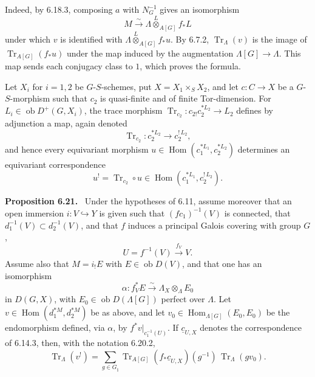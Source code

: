 \documentclass[12pt]{article}
\newcommand{\Hom}{\operatorname{Hom}}
\newcommand{\Tr}{\operatorname{Tr}}
\newcommand{\ob}{\operatorname{ob}}
\newenvironment{statement}[1]{\par\medskip\noindent\textbf{#1.}\ }{\par\medskip}
\begin{document}
Indeed, by 6.18.3, composing $a$ with $N_G^{-1}$ gives an isomorphism
\[
       M\xrightarrow{\sim}\Lambda\overset{L}{\otimes}_{A[G]}f_*L
\]
under which $v$ is identified with $\Lambda\overset{L}{\otimes}_{A[G]}f_*u$. By
6.7.2, $\Tr_\Lambda(v)$ is the image of $\Tr_{A[G]}(f_*u)$ under the map induced
by the augmentation $\Lambda[G]\to\Lambda$. This map sends each conjugacy class
to $1$, which proves the formula.

Let $X_i$ for $i=1,2$ be $G$-$S$-schemes, put $X=X_1\times_S X_2$, and let
$c:C\to X$ be a $G$-$S$-morphism such that $c_2$ is quasi-finite and of finite
Tor-dimension. For $L_i\in\ob D^+(G,X_i)$, the trace morphism
$\Tr_{c_2}:c_{2!}c_2^{*L_2}\to L_2$ defines by adjunction a map, again denoted
\begin{equation}\tag{6.20.1}
      \Tr_{c_2}:c_2^{*L_2}\longrightarrow c_2^{!\,L_2},
\end{equation}
and hence every equivariant morphism
$u\in\Hom(c_1^{*L_1},c_2^{*L_2})$ determines an equivariant correspondence
\begin{equation}\tag{6.20.2}
      u^!=\Tr_{c_2}\circ u\in\Hom(c_1^{*L_1},c_2^{!\,L_2}).
\end{equation}

\begin{statement}{Proposition 6.21}
Under the hypotheses of 6.11, assume moreover that an open immersion
$i:V\hookrightarrow Y$ is given such that $(fc_1)^{-1}(V)$ is connected, that
$d_1^{-1}(V)\subset d_2^{-1}(V)$, and that $f$ induces a principal Galois covering
with group $G$,
\[
      U=f^{-1}(V)\xrightarrow{f_V}V.
\]
Assume also that $M=i_!E$ with $E\in\ob D(V)$, and that one has an isomorphism
\[
      \alpha:f_V^*E\xrightarrow{\sim}\Lambda_X\otimes_\Lambda E_0
\]
in $D(G,X)$, with $E_0\in\ob D(\Lambda[G])$ perfect over $\Lambda$. Let
$v\in\Hom(d_1^{*M},d_2^{*M})$ be as above, and let
$v_0\in\Hom_{\Lambda[G]}(E_0,E_0)$ be the endomorphism defined, via $\alpha$, by
$f^*v|_{c_1^{-1}(U)}$. If $\underline c_{U,X}$ denotes the correspondence of
6.14.3, then, with the notation 6.20.2,
\begin{equation}\tag{6.23.1}
\Tr_\Lambda(v^!)=
\sum_{g\in G_\natural}
\Tr_{A[G]}(f_*\underline c_{U,X})(g^{-1})\,\Tr_\Lambda(gv_0).
\end{equation}
\end{statement}
\end{document}
